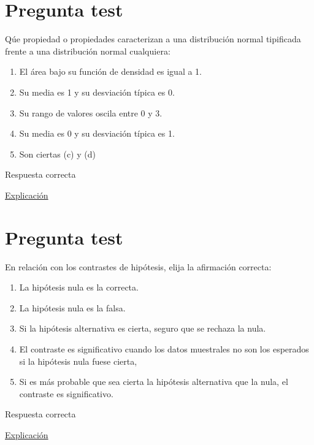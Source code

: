 \documentclass[
]{book}
\providecommand{\tightlist}{%
  \setlength{\itemsep}{0pt}\setlength{\parskip}{0pt}}
\begin{document}
\hypertarget{pregunta-test-106}{%
\section{Pregunta test}\label{pregunta-test-106}}

Qúe propiedad o propiedades caracterizan a una distribución normal tipificada frente a una distribución normal cualquiera:

\begin{enumerate}
\def\labelenumi{\alph{enumi})}
\tightlist
\item
  El área bajo su función de densidad es igual a 1.
\item
  Su media es 1 y su desviación típica es 0.
\item
  Su rango de valores oscila entre 0 y 3.
\item
  Su media es 0 y su desviación típica es 1.
\item
  Son ciertas (c) y (d)
\end{enumerate}

Respuesta correcta

\href{https://1fjmanzano.github.io/bioestadistica/distribuciones-de-probabilidad.html\#distribucio\%CC\%81n-z}{Explicación}

\hypertarget{pregunta-test-107}{%
\section{Pregunta test}\label{pregunta-test-107}}

En relación con los contrastes de hipótesis, elija la afirmación correcta:

\begin{enumerate}
\def\labelenumi{\alph{enumi})}
\tightlist
\item
  La hipótesis nula es la correcta.
\item
  La hipótesis nula es la falsa.
\item
  Si la hipótesis alternativa es cierta, seguro que se rechaza la nula.
\item
  El contraste es significativo cuando los datos muestrales no son los esperados si la hipótesis nula fuese cierta,
\item
  Si es más probable que sea cierta la hipótesis alternativa que la nula, el contraste es significativo.
\end{enumerate}

Respuesta correcta

\href{https://1fjmanzano.github.io/bioestadistica/contrastes-de-hipo\%CC\%81tesis.html}{Explicación}
\end{document}
